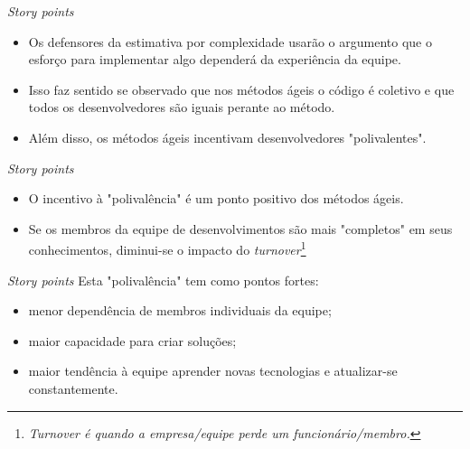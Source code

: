 \documentclass[11pt]{beamer}
\begin{document}
    \begin{frame}{\textit{Story points}}
        \begin{itemize}
            \item Os defensores da estimativa por complexidade usarão o argumento que o esforço para implementar algo dependerá da experiência da equipe.
            \item Isso faz sentido se observado que nos métodos ágeis o código é coletivo e que todos os desenvolvedores são iguais perante ao método.
            \item Além disso, os métodos ágeis incentivam desenvolvedores "polivalentes".
        \end{itemize}
    \end{frame}

    \begin{frame}{\textit{Story points}}
        \begin{itemize}
            \item O incentivo à "polivalência" é um ponto positivo dos métodos ágeis.
            \item Se os membros da equipe de desenvolvimentos são mais "completos" em seus conhecimentos, diminui-se o impacto do \textit{turnover}\footnote{\textit{Turnover é quando a empresa/equipe perde um funcionário/membro.}}
        \end{itemize}
    \end{frame}

    \begin{frame}{\textit{Story points}}
        Esta "polivalência" tem como pontos fortes:
        \begin{itemize}
            \item menor dependência de membros individuais da equipe;
            \item maior capacidade para criar soluções;
            \item maior tendência à equipe aprender novas tecnologias e atualizar-se constantemente.
        \end{itemize}
    \end{frame}
\end{document}
